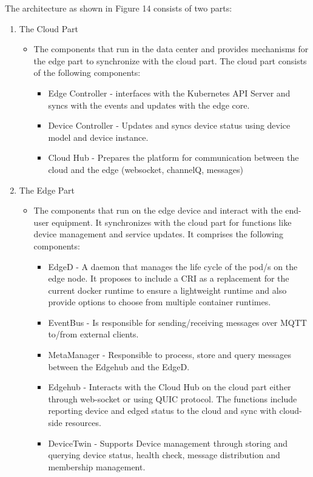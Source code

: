 \begin{flushleft}
The architecture as shown in Figure 14 consists of two parts:
\end{flushleft}
\begin{enumerate}
    \item The Cloud Part
        \begin{itemize}
	    \item The components that run in the data center and provides mechanisms for the edge part to synchronize with the cloud part. The cloud part consists of the following components:
	        \begin{itemize}
	            \item Edge Controller - interfaces with the Kubernetes API Server and syncs with the events and updates with the edge core.
	            \item Device Controller - Updates and syncs device status using device model and device instance. 
		    \item Cloud Hub - Prepares the platform for communication between the cloud and the edge (websocket, channelQ, messages)
		\end{itemize}
	\end{itemize}
    \item The Edge Part
        \begin{itemize}
            \item The components that run on the edge device and interact with the end-user equipment. It synchronizes with the cloud part for functions like device management and service updates. It comprises the following components:
		\begin{itemize}
		    \item EdgeD - A daemon that manages the life cycle of the pod/s on the edge node. It proposes to include a CRI as a replacement for the current docker runtime to ensure a lightweight runtime and also provide options to choose from multiple container runtimes.
	            \item EventBus - Is responsible for sending/receiving messages over MQTT to/from external clients.
	            \item MetaManager - Responsible to process, store and query messages between the Edgehub and the EdgeD. 
	            \item Edgehub - Interacts with the Cloud Hub on the cloud part either through web-socket or using QUIC protocol. The functions include reporting device and edged status to the cloud and sync with cloud-side resources.
		    \item DeviceTwin - Supports Device management through storing and querying device status, health check, message distribution and membership management.
		\end{itemize}
	\end{itemize}
\end{enumerate}
